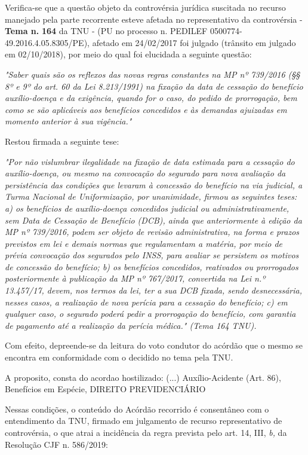 \documentclass[12pt]{article}
\begin{document}
\justifying
\noindent Verifica-se que a questão objeto da controvérsia jurídica suscitada no recurso manejado pela parte recorrente esteve afetada no representativo da controvérsia - \textbf{Tema n. }\textbf{164} da TNU - (PU no processo n. PEDILEF 0500774-49.2016.4.05.8305/PE),  afetado em 24/02/2017 foi julgado (trânsito em julgado em 02/10/2018), por meio do qual foi elucidada a seguinte questão:

\noindent \textit{"Saber quais são os reflexos das novas regras constantes na MP nº 739/2016 (§§ 8º e 9º do art. 60 da Lei 8.213/1991) na fixação da data de cessação do benefício auxílio-doença e da exigência, quando for o caso, do pedido de prorrogação, bem como se são aplicáveis aos benefícios concedidos e às demandas ajuizadas em momento anterior à sua vigência."}

\noindent Restou firmada a seguinte tese:

\noindent \textit{"Por não vislumbrar ilegalidade na fixação de data estimada para a cessação do auxílio-doença, ou mesmo na convocação do segurado para nova avaliação da persistência das condições que levaram à concessão do benefício na via judicial, a Turma Nacional de Uniformização, por unanimidade, firmou as seguintes teses: a) os benefícios de auxílio-doença concedidos judicial ou administrativamente, sem Data de Cessação de Benefício (DCB), ainda que anteriormente à edição da MP nº 739/2016, podem ser objeto de revisão administrativa, na forma e prazos previstos em lei e demais normas que regulamentam a matéria, por meio de prévia convocação dos segurados pelo INSS, para avaliar se persistem os motivos de concessão do benefício; b) os benefícios concedidos, reativados ou prorrogados posteriormente à publicação da MP nº 767/2017, convertida na Lei n.º 13.457/17, devem, nos termos da lei, ter a sua DCB fixada, sendo desnecessária, nesses casos, a realização de nova perícia para a cessação do benefício; c) em qualquer caso, o segurado poderá pedir a prorrogação do benefício, com garantia de pagamento até a realização da perícia médica." (Tema 164 TNU).}

\noindent Com efeito, depreende-se da leitura do voto condutor do acórdão que o mesmo se encontra em conformidade com o decidido no  tema pela TNU.

\noindent A proposito, consta do acordao hostilizado: (...) Auxílio-Acidente (Art. 86), Benefícios em Espécie, DIREITO PREVIDENCIÁRIO

\noindent Nessas condições, o conteúdo do Acórdão recorrido é consentâneo com o entendimento da TNU, firmado em julgamento de recurso representativo de controvérsia, o que atrai a incidência da regra prevista pelo art. 14, III, \textit{b,} da Resolução CJF n. 586/2019:
\end{document}
